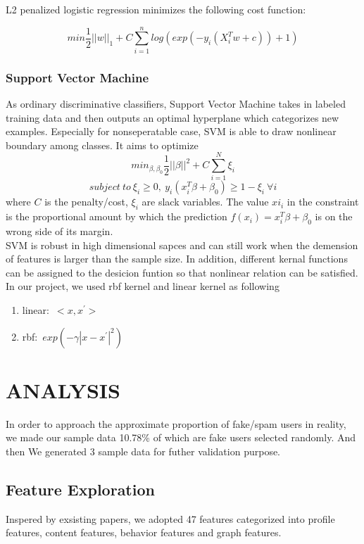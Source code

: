 \documentclass[a4paper, 12pt]{report}
\begin{document}
\noindent L2 penalized logistic regression minimizes the following cost function:

$$
min\frac1{2}||w||_{1} + C \sum_{i = 1}^n log(exp(-y_{i}(X_{i}^Tw + c)) + 1)
$$

\subsubsection*{Support Vector Machine}
As ordinary discriminative classifiers, Support Vector Machine
takes in labeled training data and then outputs an optimal hyperplane which categorizes new examples. Especially for nonseperatable case, SVM is able to draw nonlinear boundary among classes. It aims to optimize
$$min_{\beta, \beta_0}\frac{1}{2}||\beta||^2+C\sum_{i=1}^{N}\xi_i$$ 
$$subject\ to\ \xi_i\geq 0,\ y_i(x_i^T\beta+\beta_0)\geq 1-\xi_i\ \forall i$$ 
where $C$ is the penalty/cost, $\xi_i$ are slack variables. The value $xi_i$ in the constraint is the proportional amount by which the prediction $f(x_i)=x_i^T\beta+\beta_0$ is on the wrong side of its margin.\\
SVM is robust in high dimensional sapces and can still work when the demension of features is larger than the sample size. In addition, different kernal functions can be assigned to the desicion funtion so that nonlinear relation can be satisfied.\\
In our project, we used rbf kernel and linear kernel as following
\begin{enumerate}
	\item []linear:\ $<x,x^{'}>$
	\item []rbf:\ $exp(-\gamma|x-x^{'}|^2)$
\end{enumerate}

\section*{ANALYSIS}
In order to approach the approximate proportion of fake/spam users in reality, we made our sample data 10.78\% of which are fake users selected randomly. And then We generated 3 sample data for futher validation purpose.
\subsection*{Feature Exploration}
Inspered by exsisting papers, we adopted 47 features categorized into profile features, content features, behavior features and graph features. \par
\end{document}
